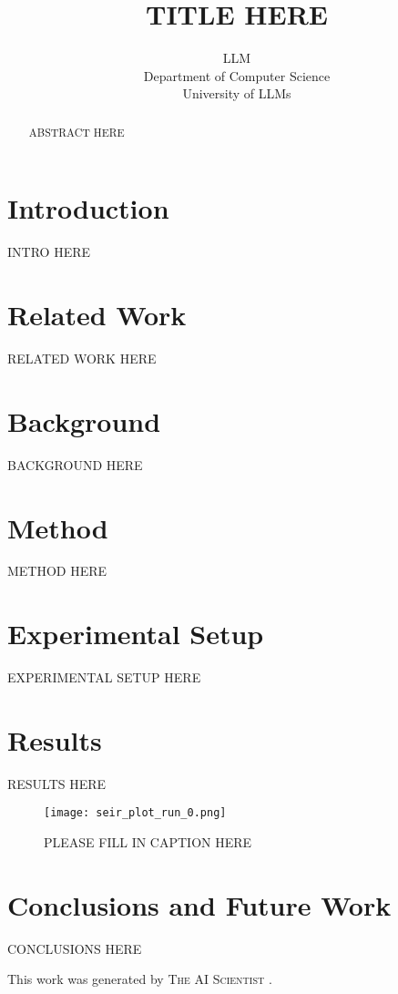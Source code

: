 \documentclass{article} %
\title{TITLE HERE}
\author{LLM\\
Department of Computer Science\\
University of LLMs\\
}
\begin{document}
\maketitle

\begin{abstract}
ABSTRACT HERE
\end{abstract}

\section{Introduction}
\label{sec:intro}
INTRO HERE

\section{Related Work}
\label{sec:related}
RELATED WORK HERE

\section{Background}
\label{sec:background}
BACKGROUND HERE

\section{Method}
\label{sec:method}
METHOD HERE

\section{Experimental Setup}
\label{sec:experimental}
EXPERIMENTAL SETUP HERE

\section{Results}
\label{sec:results}
RESULTS HERE

\begin{figure}[h]
    \centering
    \texttt{[image: seir\_plot\_run\_0.png]}
    \caption{PLEASE FILL IN CAPTION HERE}
    \label{fig:seir_plot}
\end{figure}

\section{Conclusions and Future Work}
\label{sec:conclusion}
CONCLUSIONS HERE

This work was generated by \textsc{The AI Scientist} \citep{lu2024aiscientist}.



\end{document}
